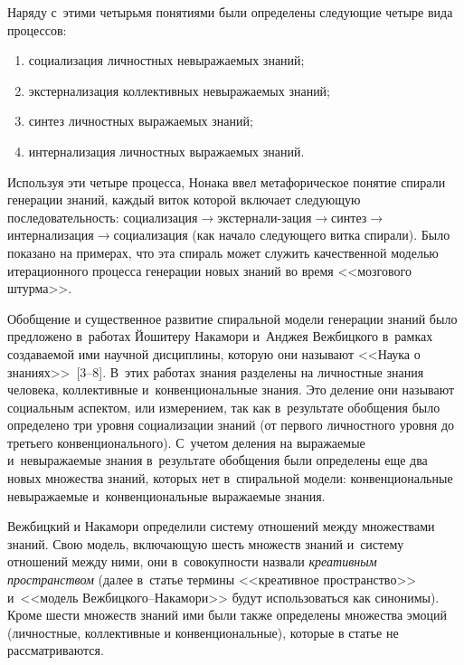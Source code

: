 {\begin{multicols}{2}
      Наряду с~этими четырьмя понятиями были определены следующие четыре вида 
процессов:
      \begin{enumerate}[(1)]
\item социализация личностных невыражаемых знаний;\\[-15pt]
\item экстернализация коллективных невыража\-емых знаний;\\[-15pt]
\item синтез личностных выража\-емых знаний;
\item интернализация личностных выражаемых знаний.
\end{enumerate}



      Используя эти четыре процесса, Нонака ввел метафорическое понятие спирали 
генерации знаний, каждый виток которой включает следующую последовательность:  
со\-циа\-ли\-за\-ция\;$\to$\;экстер\-на\-ли-\linebreak за\-ция\;$\to$\;син\-тез\;$\to$\;ин\-тер\-на\-ли\-за\-ция\;$\to$\;со\-циа\-ли\-за\-ция 
(как начало следующего витка спирали). 
Было показано на примерах, что эта спираль может служить качественной моделью 
итерационного процесса генерации новых знаний во время <<мозгового штурма>>.
      
      Обобщение и существенное развитие спиральной модели генерации знаний было 
предложено в~работах Йошитеру Накамори и~Анджея Вежбицкого в~рамках создаваемой 
ими научной дисциплины, которую они называют <<Наука о знаниях>>~[3--8]. В~этих 
работах знания разделены на личностные знания человека, коллективные 
и~конвенциональные знания. Это деление они называют социальным аспектом, или 
измерением, так как в~результате обобщения было определено три уровня социализации 
знаний (от первого личностного уровня до третьего конвенционального). С~учетом деления 
на выражаемые и~невыражаемые знания в~результате обобщения были определены еще два 
новых множества знаний, которых нет в~спиральной модели: конвенциональные 
невыражаемые и~конвенциональные выражаемые знания.
      
      Вежбицкий и Накамори определили систему\linebreak
       отношений между множествами 
знаний. Свою модель, включающую шесть множеств знаний и~сис\-те\-му отношений между 
ними, они в~совокупности назвали \textit{креативным пространством} (далее в~\mbox{статье} 
термины <<креативное пространство>> и~<<модель Веж\-биц\-ко\-го--На\-ка\-мо\-ри>> 
будут использоваться как синонимы). Кроме шести множеств знаний ими были также 
определены множества эмоций (личностные, коллективные и конвенциональные), которые 
в статье не рассматриваются. 


\end{multicols}}
